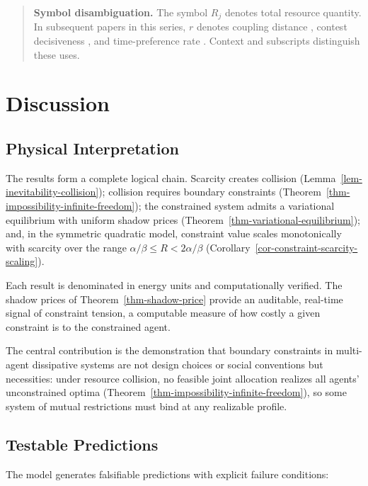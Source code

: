 \documentclass[11pt]{article}
\theoremstyle{plain}
\theoremstyle{definition}
\theoremstyle{remark}
\let\origsection\section
\renewcommand{\section}{\needspace{12\baselineskip}\origsection}
\let\origsubsection\subsection
\renewcommand{\subsection}{\needspace{7\baselineskip}\origsubsection}
\begin{document}
\begin{quote}
\textbf{Symbol disambiguation.} The symbol \(R_j\) denotes total
resource quantity. In subsequent papers in this series, \(r\) denotes
coupling distance \citep{TC-VI}, contest decisiveness \citep{TC-IV}, and
time-preference rate \citep{TC-V}. Context and subscripts distinguish
these uses.
\end{quote}

\section{Discussion}\label{discussion}

\subsection{Physical Interpretation}\label{physical-interpretation-1}

The results form a complete logical chain. Scarcity creates collision
(Lemma~\ref{lem-inevitability-collision}); collision requires boundary
constraints (Theorem~\ref{thm-impossibility-infinite-freedom}); the
constrained system admits a variational equilibrium with uniform shadow
prices (Theorem~\ref{thm-variational-equilibrium}); and, in the
symmetric quadratic model, constraint value scales monotonically with
scarcity over the range \(\alpha/\beta \leq R < 2\alpha/\beta\)
(Corollary~\ref{cor-constraint-scarcity-scaling}).

Each result is denominated in energy units and computationally verified.
The shadow prices of Theorem~\ref{thm-shadow-price} provide an
auditable, real-time signal of constraint tension, a computable measure
of how costly a given constraint is to the constrained agent.

The central contribution is the demonstration that boundary constraints
in multi-agent dissipative systems are not design choices or social
conventions but necessities: under resource collision, no feasible joint
allocation realizes all agents' unconstrained optima
(Theorem~\ref{thm-impossibility-infinite-freedom}), so some system of
mutual restrictions must bind at any realizable profile.

\subsection{Testable Predictions}\label{testable-predictions}

The model generates falsifiable predictions with explicit failure
conditions:
\end{document}
